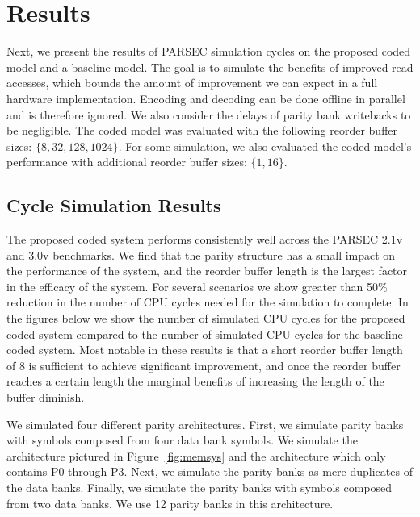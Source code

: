   \section{Results}
\label{sec:results}

Next, we present the results of PARSEC simulation cycles on the proposed coded model and a baseline model. The goal is to simulate the benefits of improved read accesses, which bounds the amount of improvement we can expect in a full hardware implementation. Encoding and decoding can be done offline in parallel and is therefore ignored. We also consider the delays of parity bank writebacks to be negligible. The coded model was evaluated with the following reorder buffer sizes: $\{8,32,128,1024\}$. For some simulation, we also evaluated the coded model's performance with additional reorder buffer sizes: $\{1, 16\}$.
\subsection{Cycle Simulation Results}
\label{sec:results}

The proposed coded system performs consistently well across the PARSEC 2.1v and 3.0v benchmarks. We find that the parity structure has a small impact on the performance of the system, and the reorder buffer length is  the largest factor in the efficacy of the system. For several scenarios we show greater than 50\% reduction in the number of CPU cycles needed for the simulation to complete. In the figures below we show the number of simulated CPU cycles for the proposed coded system compared to the number of simulated CPU cycles for the baseline coded system. Most notable in these results is that a short reorder buffer length of 8 is sufficient to achieve significant improvement, and once the reorder buffer reaches a certain length the marginal benefits of increasing the length of the buffer diminish.

We simulated four different parity architectures. First, we simulate parity banks with symbols composed from four data bank symbols. We simulate the architecture pictured in Figure~\ref{fig:memsys} and the architecture which only contains P0 through P3. Next, we simulate the parity banks as mere duplicates of the data banks. Finally, we simulate the parity banks with symbols composed from two data banks. We use 12 parity banks in this architecture. 



